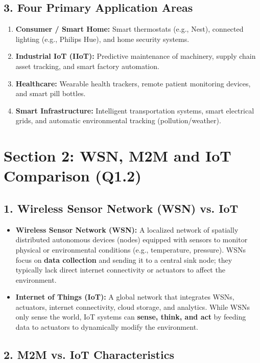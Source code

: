 \subsection{3. Four Primary Application Areas}
\begin{enumerate}
  \item \textbf{Consumer / Smart Home:} Smart thermostats (e.g., Nest), connected lighting (e.g., Philips Hue), and home security systems.
  \item \textbf{Industrial IoT (IIoT):} Predictive maintenance of machinery, supply chain asset tracking, and smart factory automation.
  \item \textbf{Healthcare:} Wearable health trackers, remote patient monitoring devices, and smart pill bottles.
  \item \textbf{Smart Infrastructure:} Intelligent transportation systems, smart electrical grids, and automatic environmental tracking (pollution/weather).
\end{enumerate}


\section{Section 2: WSN, M2M and IoT Comparison (Q1.2)}

\subsection{1. Wireless Sensor Network (WSN) vs. IoT}
\begin{itemize}
  \item   \textbf{Wireless Sensor Network (WSN):} A localized network of spatially distributed autonomous devices (nodes) equipped with sensors to monitor physical or environmental conditions (e.g., temperature, pressure). WSNs focus on \textbf{data collection} and sending it to a central sink node; they typically lack direct internet connectivity or actuators to affect the environment.
  \item   \textbf{Internet of Things (IoT):} A global network that integrates WSNs, actuators, internet connectivity, cloud storage, and analytics. While WSNs only sense the world, IoT systems can \textbf{sense, think, and act} by feeding data to actuators to dynamically modify the environment.
\end{itemize}

\subsection{2. M2M vs. IoT Characteristics}

